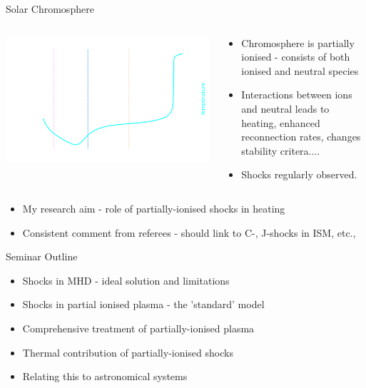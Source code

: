 \documentclass[10pt,aspectratio=169,usenames,dvipsnames]{beamer}
\begin{document}
\begin{frame}{Solar Chromosphere}
\begin{columns}
\begin{column}{0.45\textwidth}
\includegraphics[width=0.95\linewidth]{2023StAndrewsAstro/Figures/saha2_plot.png}
\end{column}
\begin{column}{0.55\textwidth}
\begin{itemize}
    \item Chromosphere is partially ionised - consists of both ionised and neutral species
    \item Interactions between ions and neutral leads to heating, enhanced reconnection rates, changes stability critera....
    \item Shocks regularly observed.
\end{itemize}
\end{column}
\end{columns}
\begin{itemize}
    \item My research aim - role of partially-ionised shocks in heating
    \item Consistent comment from referees - should link to C-, J-shocks in ISM, etc.,
\end{itemize}
\end{frame}

\begin{frame}{Seminar Outline}
\begin{itemize}
    \item Shocks in MHD - ideal solution and limitations
    \item Shocks in partial ionised plasma - the 'standard' model
    \item Comprehensive treatment of partially-ionised plasma
    \item Thermal contribution of partially-ionised shocks
    \item Relating this to astronomical systems
\end{itemize}
\end{frame}
\end{document}
